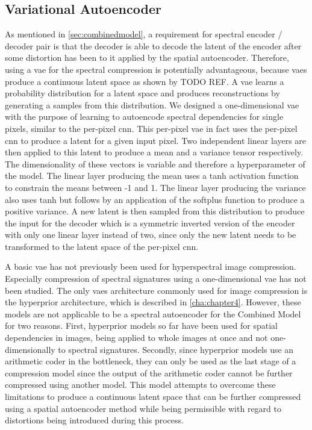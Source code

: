 \subsection{Variational Autoencoder \label{sec:vae}}
As mentioned in \autoref{sec:combinedmodel}, a requirement for spectral encoder / decoder pair is that the decoder is able to decode the latent of the encoder after some distortion  has been to it applied by the spatial autoencoder. Therefore, using a \ac{vae} for the spectral compression is potentially advantageous, because \acp{vae} produce a continuous latent space as shown by TODO REF. A \ac{vae} learns a probability distribution for a latent space and produces reconstructions by generating a samples from this distribution. We designed a one-dimensional \ac{vae} with the purpose of learning to autoencode spectral dependencies for single pixels, similar to the per-pixel \ac{cnn}. This per-pixel \ac{vae} in fact uses the per-pixel \ac{cnn} to produce a latent for a given input pixel. Two independent linear layers are then applied to this latent to produce a mean and a variance tensor respectively. The dimensionality of these vectors is variable and therefore a hyperparameter of the model. The linear layer producing the mean uses a tanh activation function to constrain the means between -1 and 1. The linear layer producing the variance also uses tanh but follows by an application of the softplus function to produce a positive variance. A new latent is then sampled from this distribution to produce the input for the decoder which is a symmetric inverted version of the encoder with only one linear layer instead of two, since only the new latent needs to be transformed to the latent space of the per-pixel \ac{cnn}.

A basic \ac{vae} has not previously been used for hyperspectral image compression. Especially compression of spectral signatures using a one-dimensional \ac{vae} has not been studied. The only \acp{vae} architecture commonly used for image compression is the hyperprior architecture, which is described in \autoref{cha:chapter4}. However, these models are not applicable to be a spectral autoencoder for the Combined Model for two reasons. First, hyperprior models so far have been used for spatial dependencies in images, being applied to whole images at once and not one-dimensionally to spectral signatures. Secondly, since hyperprior models use an arithmetic coder in the bottleneck, they can only be used as the last stage of a compression model since the output of the arithmetic coder cannot be further compressed using another model. This model attempts to overcome these limitations to produce a continuous latent space that can be further compressed using a spatial autoencoder method while being permissible with regard to distortions being introduced during this process.
